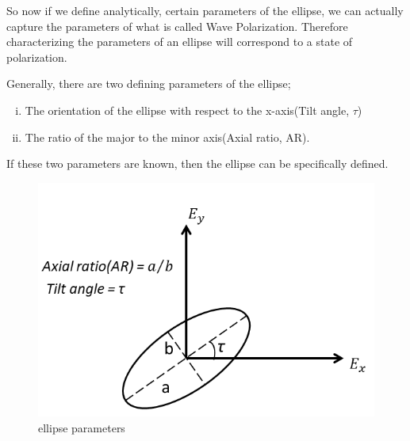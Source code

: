 So now if we define analytically, certain parameters of the ellipse, we can actually capture the parameters of what is called Wave Polarization. Therefore characterizing the parameters of an ellipse will correspond to a state of polarization.

Generally, there are two defining parameters of the ellipse;
\begin{enumerate}[(i)]
\item The orientation of the ellipse with respect to the x-axis(Tilt angle, $\tau$) 
\item The ratio of the major to the minor axis(Axial ratio, AR).
\end{enumerate}
If these two parameters are known, then the ellipse can be specifically defined.
\begin{figure}[h]
\centering
\includegraphics[width=1\linewidth]{graphics/ellipse_parameters}
\caption{ellipse parameters}
\end{figure}

